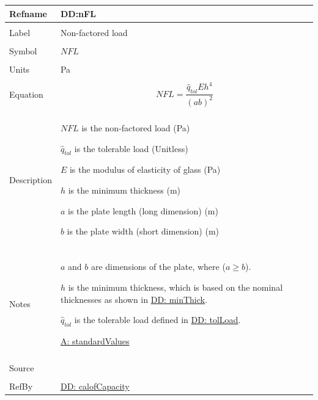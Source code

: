 \documentclass[12pt]{article}
\begin{document}
\noindent \begin{minipage}{\textwidth}
\begin{tabular}{>{\raggedright}p{}>{\raggedright\arraybackslash}p{}}
\toprule \textbf{Refname} & \textbf{DD:nFL}
\label{DD:nFL}
\\ \midrule \\
Label & Non-factored load
        
\\ \midrule \\
Symbol & $NFL$
         
\\ \midrule \\
Units & Pa
        
\\ \midrule \\
Equation & \begin{displaymath}
           NFL=\frac{{\hat{q}_{tol}} E h^{4}}{\left(a b\right)^{2}}
           \end{displaymath}
\\ \midrule \\
Description & \begin{symbDescription}
              \item{$NFL$ is the non-factored load (Pa)}
              \item{${\hat{q}_{tol}}$ is the tolerable load (Unitless)}
              \item{$E$ is the modulus of elasticity of glass (Pa)}
              \item{$h$ is the minimum thickness (m)}
              \item{$a$ is the plate length (long dimension) (m)}
              \item{$b$ is the plate width (short dimension) (m)}
              \end{symbDescription}
\\ \midrule \\
Notes & $a$ and $b$ are dimensions of the plate, where ($a\geq{}b$).
        
        $h$ is the minimum thickness, which is based on the nominal thicknesses as shown in \hyperref[DD:minThick]{DD: minThick}.
        
        ${\hat{q}_{tol}}$ is the tolerable load defined in \hyperref[DD:tolLoad]{DD: tolLoad}.
        
        \hyperref[assumpSV]{A: standardValues}
        
\\ \midrule \\
Source & \cite{astm2009}
         
\\ \midrule \\
RefBy & \hyperref[DD:calofCapacity]{DD: calofCapacity}
        
\\ \bottomrule
\end{tabular}
\end{minipage}
\end{document}
